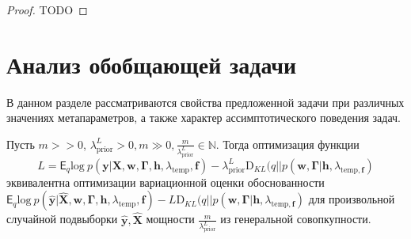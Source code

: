 \begin{proof}
TODO
\end{proof}

\section{Анализ обобщающей задачи}
В данном разделе рассматриваются свойства предложенной задачи при различных значениях метапараметров, а также характер ассимптотического поведения задач.

\begin{theorem}
Пусть $m>>0$, ${\lambda_\text{prior}^L} > 0, m \gg 0, \frac{m}{\lambda_\text{prior}^L} \in \mathbb{N}.$ Тогда оптимизация функции
\[
L = 
{\mathsf{E}_q \text{log}~{p(\mathbf{y} | \mathbf{X}, \mathbf{w}, \boldsymbol{\Gamma}, \mathbf{h}, \lambda_{\text{temp}},\mathbf{f})}} - {\lambda_\text{prior}^L\text{D}_{KL}(q||p(\mathbf{w}, \boldsymbol{\Gamma} |\mathbf{h}, \lambda_{\text{temp}, \mathbf{f}})}
\] эквивалентна оптимизации вариационной оценки обоснованности  $\mathsf{E}_q \text{log}~{p(\hat{\mathbf{y}} | \hat{\mathbf{X}}, \mathbf{w}, \boldsymbol{\Gamma}, \mathbf{h}, \lambda_{\text{temp}},\mathbf{f})} - L\text{D}_{KL}(q||p(\mathbf{w}, \boldsymbol{\Gamma} |\mathbf{h}, \lambda_{\text{temp}, \mathbf{f}})$
для произвольной случайной подвыборки $\hat{\mathbf{y}}, \hat{\mathbf{X}}$ мощности $\frac{m}{{\lambda_\text{prior}^L}}$ из генеральной совопкупности.
\end{theorem}
